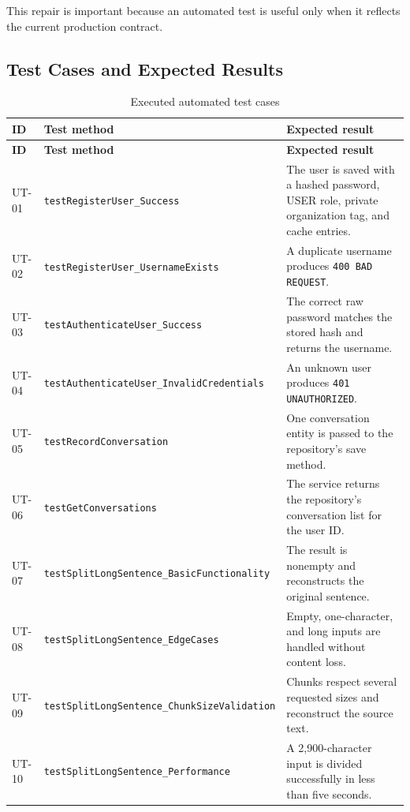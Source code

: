 \documentclass[11pt,a4paper]{article}
\begin{document}
This repair is important because an automated test is useful only when it reflects the
current production contract.

\subsection{Test Cases and Expected Results}

\begin{longtable}{@{}p{}p{}p{}@{}}
\caption{Executed automated test cases}\\
\toprule
\textbf{ID} & \textbf{Test method} & \textbf{Expected result} \\
\midrule
\endfirsthead
\toprule
\textbf{ID} & \textbf{Test method} & \textbf{Expected result} \\
\midrule
\endhead
UT-01 & \texttt{testRegisterUser\_Success} &
The user is saved with a hashed password, USER role, private organization tag, and
cache entries. \\
UT-02 & \texttt{testRegisterUser\_UsernameExists} &
A duplicate username produces \texttt{400 BAD REQUEST}. \\
UT-03 & \texttt{testAuthenticateUser\_Success} &
The correct raw password matches the stored hash and returns the username. \\
UT-04 & \texttt{testAuthenticateUser\_InvalidCredentials} &
An unknown user produces \texttt{401 UNAUTHORIZED}. \\
UT-05 & \texttt{testRecordConversation} &
One conversation entity is passed to the repository's save method. \\
UT-06 & \texttt{testGetConversations} &
The service returns the repository's conversation list for the user ID. \\
UT-07 & \texttt{testSplitLongSentence\_BasicFunctionality} &
The result is nonempty and reconstructs the original sentence. \\
UT-08 & \texttt{testSplitLongSentence\_EdgeCases} &
Empty, one-character, and long inputs are handled without content loss. \\
UT-09 & \texttt{testSplitLongSentence\_ChunkSizeValidation} &
Chunks respect several requested sizes and reconstruct the source text. \\
UT-10 & \texttt{testSplitLongSentence\_Performance} &
A 2,900-character input is divided successfully in less than five seconds. \\
\bottomrule
\end{longtable}
\end{document}
